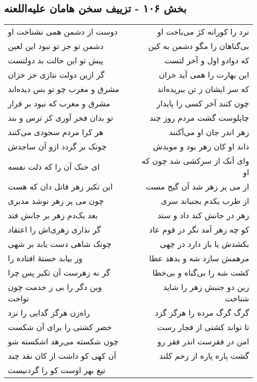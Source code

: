 \begin{center}
\section*{بخش ۱۰۶ - تزییف سخن هامان علیه‌اللعنه}
\label{sec:sh106}
\begin{longtable}{l p{0.5cm} r}
دوست از دشمن همی نشناخت او
&&
نرد را کورانه کژ می‌باخت او
\\
دشمن تو جز تو نبود این لعین
&&
بی‌گناهان را مگو دشمن به کین
\\
پیش تو این حالت بد دولتست
&&
که دوادو اول و آخر لتست
\\
گر ازین دولت نتازی خز خزان
&&
این بهارت را همی آید خزان
\\
مشرق و مغرب چو تو بس دیده‌اند
&&
که سر ایشان ز تن ببریده‌اند
\\
مشرق و مغرب که نبود بر قرار
&&
چون کنند آخر کسی را پایدار
\\
تو بدان فخر آوری کز ترس و بند
&&
چاپلوست گشت مردم روز چند
\\
هر کرا مردم سجودی می‌کنند
&&
زهر اندر جان او می‌آکنند
\\
چونک بر گردد ازو آن ساجدش
&&
داند او کان زهر بود و موبدش
\\
ای خنک آن را که ذلت نفسه
&&
وای آنک از سرکشی شد چون که او
\\
این تکبر زهر قاتل دان که هست
&&
از می پر زهر شد آن گیج مست
\\
چون می پر زهر نوشد مدبری
&&
از طرب یکدم بجنباند سری
\\
بعد یک‌دم زهر بر جانش فتد
&&
زهر در جانش کند داد و ستد
\\
گر نذاری زهری‌اش را اعتقاد
&&
کو چه زهر آمد نگر در قوم عاد
\\
چونک شاهی دست یابد بر شهی
&&
بکشدش یا باز دارد در چهی
\\
ور بیابد خستهٔ افتاده را
&&
مرهمش سازد شه و بدهد عطا
\\
گر نه زهرست آن تکبر پس چرا
&&
کشت شه را بی‌گناه و بی‌خطا
\\
وین دگر را بی ز خدمت چون نواخت
&&
زین دو جنبش زهر را شاید شناخت
\\
راه‌زن هرگز گدایی را نزد
&&
گرگ گرگ مرده را هرگز گزد
\\
خضر کشتی را برای آن شکست
&&
تا تواند کشتی از فجار رست
\\
چون شکسته می‌رهد اشکسته شو
&&
امن در فقرست اندر فقر رو
\\
آن کهی کو داشت از کان نقد چند
&&
گشت پاره پاره از زخم کلند
\\
تیغ بهر اوست کو را گردنیست

\end{longtable}
\end{center}
